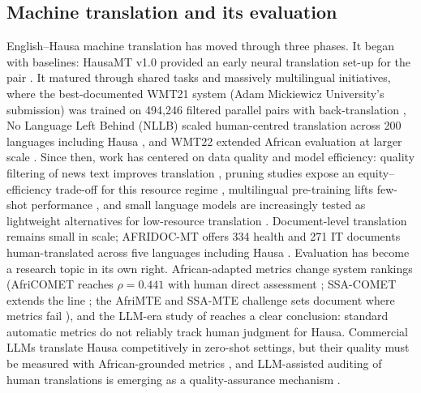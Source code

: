 \documentclass[sn-basic,pdflatex]{sn-jnl}
\begin{document}
\subsection{Machine translation and its evaluation}
English--Hausa machine translation has moved through three phases. It began with baselines: HausaMT v1.0 provided an early neural translation set-up for the pair \citep{p025}. It matured through shared tasks and massively multilingual initiatives, where the best-documented WMT21 system (Adam Mickiewicz University's submission) was trained on 494{,}246 filtered parallel pairs with back-translation \citep{p026}, No Language Left Behind (NLLB) scaled human-centred translation across 200 languages including Hausa \citep{p087}, and WMT22 extended African evaluation at larger scale \citep{p088}. Since then, work has centered on data quality and model efficiency: quality filtering of news text improves translation \citep{p089}, pruning studies expose an equity--efficiency trade-off for this resource regime \citep{p090}, multilingual pre-training lifts few-shot performance \citep{p027,p093,p096}, and small language models are increasingly tested as lightweight alternatives for low-resource translation \citep{p091}. Document-level translation remains small in scale; AFRIDOC-MT offers 334 health and 271 IT documents human-translated across five languages including Hausa \citep{p030}. Evaluation has become a research topic in its own right. African-adapted metrics change system rankings (AfriCOMET reaches $\rho{=}0.441$ with human direct assessment \citep{p028}; SSA-COMET extends the line \citep{p092}; the AfriMTE and SSA-MTE challenge sets document where metrics fail \citep{p029,p031}), and the LLM-era study of \citet{p033} reaches a clear conclusion: standard automatic metrics do not reliably track human judgment for Hausa. Commercial LLMs translate Hausa competitively in zero-shot settings, but their quality must be measured with African-grounded metrics \citep{p033}, and LLM-assisted auditing of human translations is emerging as a quality-assurance mechanism \citep{p032}.
\end{document}
